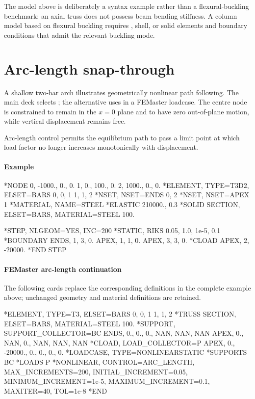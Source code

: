 The model above is deliberately a syntax example rather than a flexural-buckling benchmark: an axial truss does not possess beam bending stiffness. A column model based on flexural buckling requires , shell, or solid elements and boundary conditions that admit the relevant buckling mode.

\section{Arc-length snap-through}

A shallow two-bar arch illustrates geometrically nonlinear path following.
The main deck selects ; the alternative uses
 in a FEMaster loadcase. The centre node
is constrained to remain in the \(x=0\) plane and to have zero
out-of-plane motion, while vertical displacement remains free.

Arc-length control permits the equilibrium path to pass a limit point at which load factor no longer increases monotonically with displacement.

\paragraph*{Example}

\begin{inputdeck}
*NODE
0, -1000.,   0., 0.
1,     0., 100., 0.
2,  1000.,   0., 0.
*ELEMENT, TYPE=T3D2, ELSET=BARS
0, 0, 1
1, 1, 2
*NSET, NSET=ENDS
0, 2
*NSET, NSET=APEX
1
*MATERIAL, NAME=STEEL
*ELASTIC
210000., 0.3
*SOLID SECTION, ELSET=BARS, MATERIAL=STEEL
100.

*STEP, NLGEOM=YES, INC=200
*STATIC, RIKS
0.05, 1.0, 1e-5, 0.1
*BOUNDARY
ENDS, 1, 3, 0.
APEX, 1, 1, 0.
APEX, 3, 3, 0.
*CLOAD
APEX, 2, -20000.
*END STEP
\end{inputdeck}

\paragraph*{FEMaster arc-length continuation}

The following cards replace the corresponding definitions in the
complete example above; unchanged geometry and material definitions
are retained.

\begin{inputdeck}
*ELEMENT, TYPE=T3, ELSET=BARS
0, 0, 1
1, 1, 2
*TRUSS SECTION, ELSET=BARS, MATERIAL=STEEL
100.
*SUPPORT, SUPPORT_COLLECTOR=BC
ENDS, 0., 0., 0., NAN, NAN, NAN
APEX, 0., NAN, 0., NAN, NAN, NAN
*CLOAD, LOAD_COLLECTOR=P
APEX, 0., -20000., 0., 0., 0., 0.
*LOADCASE, TYPE=NONLINEARSTATIC
*SUPPORTS
BC
*LOADS
P
*NONLINEAR, CONTROL=ARC_LENGTH, MAX_INCREMENTS=200,
 INITIAL_INCREMENT=0.05, MINIMUM_INCREMENT=1e-5,
 MAXIMUM_INCREMENT=0.1, MAXITER=40, TOL=1e-8
*END
\end{inputdeck}

